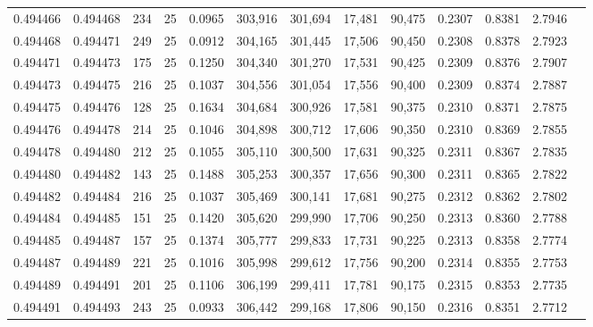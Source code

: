 \begin{tabular}{rrrrrrrrrrrrr}
0.494466 & 0.494468 &   234 &  25 &                                     0.0965 & 303,916 & 301,694 &  17,481 &  90,475 & 0.2307 & 0.8381 & 2.7946 \\
0.494468 & 0.494471 &   249 &  25 &                                     0.0912 & 304,165 & 301,445 &  17,506 &  90,450 & 0.2308 & 0.8378 & 2.7923 \\
0.494471 & 0.494473 &   175 &  25 &                                     0.1250 & 304,340 & 301,270 &  17,531 &  90,425 & 0.2309 & 0.8376 & 2.7907 \\
0.494473 & 0.494475 &   216 &  25 &                                     0.1037 & 304,556 & 301,054 &  17,556 &  90,400 & 0.2309 & 0.8374 & 2.7887 \\
0.494475 & 0.494476 &   128 &  25 &                                     0.1634 & 304,684 & 300,926 &  17,581 &  90,375 & 0.2310 & 0.8371 & 2.7875 \\
0.494476 & 0.494478 &   214 &  25 &                                     0.1046 & 304,898 & 300,712 &  17,606 &  90,350 & 0.2310 & 0.8369 & 2.7855 \\
0.494478 & 0.494480 &   212 &  25 &                                     0.1055 & 305,110 & 300,500 &  17,631 &  90,325 & 0.2311 & 0.8367 & 2.7835 \\
0.494480 & 0.494482 &   143 &  25 &                                     0.1488 & 305,253 & 300,357 &  17,656 &  90,300 & 0.2311 & 0.8365 & 2.7822 \\
0.494482 & 0.494484 &   216 &  25 &                                     0.1037 & 305,469 & 300,141 &  17,681 &  90,275 & 0.2312 & 0.8362 & 2.7802 \\
0.494484 & 0.494485 &   151 &  25 &                                     0.1420 & 305,620 & 299,990 &  17,706 &  90,250 & 0.2313 & 0.8360 & 2.7788 \\
0.494485 & 0.494487 &   157 &  25 &                                     0.1374 & 305,777 & 299,833 &  17,731 &  90,225 & 0.2313 & 0.8358 & 2.7774 \\
0.494487 & 0.494489 &   221 &  25 &                                     0.1016 & 305,998 & 299,612 &  17,756 &  90,200 & 0.2314 & 0.8355 & 2.7753 \\
0.494489 & 0.494491 &   201 &  25 &                                     0.1106 & 306,199 & 299,411 &  17,781 &  90,175 & 0.2315 & 0.8353 & 2.7735 \\
0.494491 & 0.494493 &   243 &  25 &                                     0.0933 & 306,442 & 299,168 &  17,806 &  90,150 & 0.2316 & 0.8351 & 2.7712 \\

\end{tabular}
